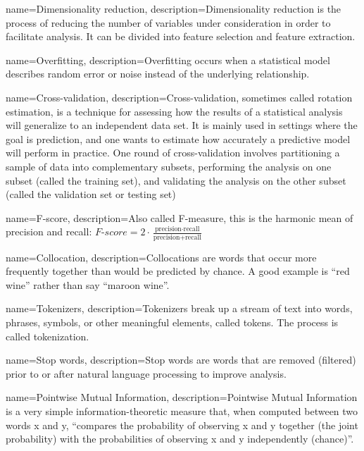 {
  name=Dimensionality reduction,
  description={Dimensionality reduction is the process of reducing the number of variables under consideration in order to facilitate analysis. It can be divided into feature selection and feature extraction.}
}

{
  name=Overfitting,
  description={Overfitting occurs when a statistical model describes random error or noise instead of the underlying relationship.}
}

{
  name=Cross-validation,
  description={Cross-validation, sometimes called rotation estimation, is a technique for assessing how the results of a statistical analysis will generalize to an independent data set. It is mainly used in settings where the goal is prediction, and one wants to estimate how accurately a predictive model will perform in practice. One round of cross-validation involves partitioning a sample of data into complementary subsets, performing the analysis on one subset (called the training set), and validating the analysis on the other subset (called the validation set or testing set)}
}


{
  name=F-score,
  description={Also called F-measure, this is the harmonic mean of precision and recall: \begin{math}\textit{F-score} = 2 \cdot \frac{\text{precision} \cdot \text{recall}}{\text{precision} + \text{recall}}\end{math}}
}

{
  name=Collocation,
  description={Collocations are words that occur more frequently together than would be predicted by chance. A good example is ``red wine'' rather than say ``maroon wine''.}
}

{
  name=Tokenizers,
  description={Tokenizers break up a stream of text into words, phrases, symbols, or other meaningful elements, called tokens. The process is called tokenization.}
}

{
  name=Stop words,
  description={Stop words are words that are removed (filtered) prior to or after natural language processing to improve analysis.}
}
  
{
  name=Pointwise Mutual Information,
  description={Pointwise Mutual Information is a very simple information-theoretic measure that, when computed between two words x and y, “compares the probability of observing x and y together (the joint probability) with the probabilities of observing x and y independently (chance)”.}
}

